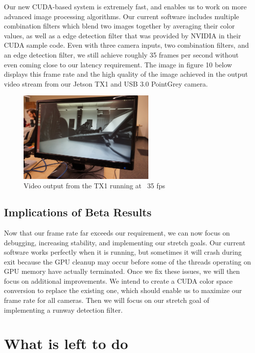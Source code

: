 \documentclass[letterpaper,10pt,titlepage]{IEEEtran}
\begin{document}
\par
Our new CUDA-based system is extremely fast, and enables us to work on more advanced image processing algorithms. Our current software includes multiple combination filters which blend two images together by averaging their color values, as well as a edge detection filter that was provided by NVIDIA in their CUDA sample code. Even with three camera inputs, two combination filters, and an edge detection filter, we still achieve roughly 35 frames per second without even coming close to our latency requirement. The image in figure 10 below displays this frame rate and the high quality of the image achieved in the output video stream from our Jetson TX1 and USB 3.0 PointGrey camera.\\

\begin{figure}[!ht]
\caption{Video output from the TX1 running at ~35 fps}
\centering
\includegraphics[width=0.6\textwidth]{images/exampleOutputNormalBeta.jpg}
\end{figure}
  
  \subsection{Implications of Beta Results}
  Now that our frame rate far exceeds our requirement, we can now focus on debugging, increasing stability, and implementing our stretch goals. Our current software works perfectly when it is running, but sometimes it will crash during exit because the GPU cleanup may occur before some of the threads operating on GPU memory have actually terminated. Once we fix these issues, we will then focus on additional improvements. We intend to create a CUDA color space conversion to replace the existing one, which should enable us to maximize our frame rate for all cameras. Then we will focus on our stretch goal of implementing a runway detection filter.

\section{What is left to do}
	
\end{document}
